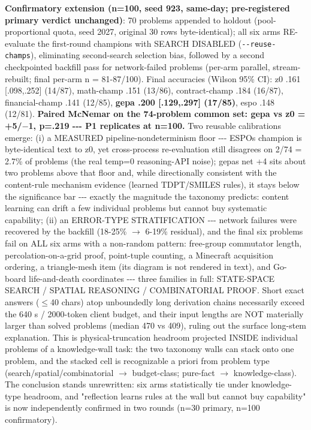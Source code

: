 \textbf{Confirmatory extension (n=100, seed 923, same-day; pre-registered primary verdict unchanged)}: 70 problems appended to holdout (pool-proportional quota, seed 2027, original 30 rows byte-identical); all six arms RE-evaluate the first-round champions with SEARCH DISABLED (\texttt{-\/-reuse-champs}), eliminating second-search selection bias, followed by a second checkpointed backfill pass for network-failed problems (per-arm parallel, stream-rebuilt; final per-arm n = 81-87/100). Final accuracies (Wilson 95\% CI): z0 .161 {[}.098,.252{]} (14/87), math-champ .151 (13/86), contract-champ .184 (16/87), financial-champ .141 (12/85), \textbf{gepa .200 {[}.129,.297{]} (17/85)}, espo .148 (12/81). \textbf{Paired McNemar on the 74-problem common set: gepa vs z0 = +5/\(-\)1, p=.219 -\/-\/- P1 replicates at n=100.} Two reusable calibrations emerge: (i) a MEASURED pipeline-nondeterminism floor -\/-\/- ESPO\textquotesingle s champion is byte-identical text to z0, yet cross-process re-evaluation still disagrees on 2/74 = 2.7\% of problems (the real temp=0 reasoning-API noise); gepa\textquotesingle s net +4 sits about two problems above that floor and, while directionally consistent with the content-rule mechanism evidence (learned TDPT/SMILES rules), it stays below the significance bar -\/-\/- exactly the magnitude the taxonomy predicts: content learning can drift a few individual problems but cannot buy systematic capability; (ii) an ERROR-TYPE STRATIFICATION -\/-\/- network failures were recovered by the backfill (18-25\% \(\rightarrow\) 6-19\% residual), and the final six problems fail on ALL six arms with a non-random pattern: free-group commutator length, percolation-on-a-grid proof, point-tuple counting, a Minecraft acquisition ordering, a triangle-mesh item (its diagram is not rendered in text), and Go-board life-and-death coordinates -\/-\/- three families in full: STATE-SPACE SEARCH / SPATIAL REASONING / COMBINATORIAL PROOF. Short exact answers (\(\leq\)40 chars) atop unboundedly long derivation chains necessarily exceed the 640 s / 2000-token client budget, and their input lengths are NOT materially larger than solved problems (median 470 vs 409), ruling out the surface long-stem explanation. This is physical-truncation headroom projected INSIDE individual problems of a knowledge-wall task: the two taxonomy walls can stack onto one problem, and the stacked cell is recognizable a priori from problem type (search/spatial/combinatorial \(\rightarrow\) budget-class; pure-fact \(\rightarrow\) knowledge-class). The conclusion stands unrewritten: six arms statistically tie under knowledge-type headroom, and "reflection learns rules at the wall but cannot buy capability" is now independently confirmed in two rounds (n=30 primary, n=100 confirmatory).

